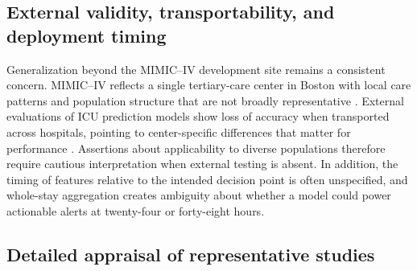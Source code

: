 \subsection{External validity, transportability, and deployment timing}
Generalization beyond the MIMIC--IV development site remains a consistent concern. MIMIC--IV reflects a single tertiary-care center in Boston with local care patterns and population structure that are not broadly representative \citep{Johnson_2023_MIMIC}. External evaluations of ICU prediction models show loss of accuracy when transported across hospitals, pointing to center-specific differences that matter for performance \citep{Rockenschaub_2024}. Assertions about applicability to diverse populations therefore require cautious interpretation when external testing is absent. In addition, the timing of features relative to the intended decision point is often unspecified, and whole-stay aggregation creates ambiguity about whether a model could power actionable alerts at twenty-four or forty-eight hours.

\subsection{Detailed appraisal of representative studies}

